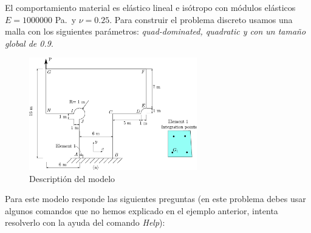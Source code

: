 El comportamiento material es elástico lineal e isótropo con módulos elásticos  $E=1000000$ Pa.~y $\nu=0.25$. Para construir el problema discreto usamos una malla con los siguientes parámetros: \textit{quad-dominated, quadratic y con un tamaño global de 0.9}.

\begin{figure}[!h]
  \begin{center}
    \includegraphics[width=0.65\textwidth]{./body/images/imagen116}
  \end{center}
  \caption{Descriptión del modelo}
  \label{figu116}
\end{figure}

Para este modelo responde las siguientes preguntas  (en este problema debes usar algunos comandos que no hemos explicado en el ejemplo anterior, intenta resolverlo con la ayuda del comando \textit{Help}):



